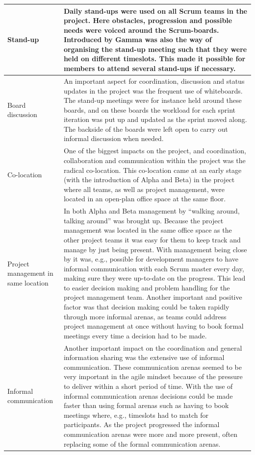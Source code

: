 \begin{center}
\begin{longtable}{| p{3.5cm} | p{8cm} |}
    Stand-up & Daily stand-ups were used on all Scrum teams in the project. Here obstacles, progression and possible needs were voiced around the Scrum-boards. Introduced by Gamma was also the way of organising the stand-up meeting such that they were held on different timeslots. This made it possible for members to attend several stand-ups if necessary. \\ \hline
    Board discussion & An important aspect for coordination, discussion and status updates in the project was the frequent use of whiteboards. The stand-up meetings were for instance held around these boards, and on these boards the workload for each sprint iteration was put up and updated as the sprint moved along. The backside of the boards were left open to carry out informal discussion when needed. \\ \hline
    Co-location & One of the biggest impacts on the project, and coordination, collaboration and communication within the project was the radical co-location. This co-location came at an early stage (with the introduction of Alpha and Beta) in the project where all teams, as well as project management, were located in an open-plan office space at the same floor. \\ \hline
    Project management in same location & In both Alpha and Beta management by ``walking around, talking around'' was brought up. Because the project management was located in the same office space as the other project teams it was easy for them to keep track and manage by just being present. With management being close by it was, e.g., possible for development managers to have informal communication with each Scrum master every day, making sure they were up-to-date on the progress. This lead to easier decision making and problem handling for the project management team. Another important and positive factor was that decision making could be taken rapidly through more informal arenas, as teams could address project management at once without having to book formal meetings every time a decision had to be made. \\ \hline
    Informal communication & Another important impact on the coordination and general information sharing was the extensive use of informal communication. These communication arenas seemed to be very important in the agile mindset because of the pressure to deliver within a short period of time. With the use of informal communication arenas decisions could be made faster than using formal arenas such as having to book meetings where, e.g., timeslots had to match for participants. As the project progressed the informal communication arenas were more and more present, often replacing some of the formal communication arenas. \\ \hline

\end{longtable}
\end{center}

